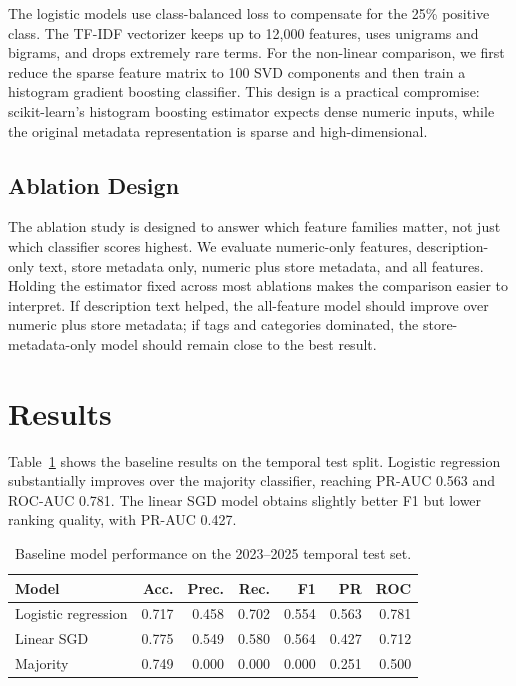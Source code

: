 \documentclass[11pt,sigconf,nonacm]{acmart}
\begin{document}
The logistic models use class-balanced loss to compensate for the 25\% positive class. The TF-IDF vectorizer keeps up to 12,000 features, uses unigrams and bigrams, and drops extremely rare terms. For the non-linear comparison, we first reduce the sparse feature matrix to 100 SVD components and then train a histogram gradient boosting classifier. This design is a practical compromise: scikit-learn's histogram boosting estimator expects dense numeric inputs, while the original metadata representation is sparse and high-dimensional.

\subsection{Ablation Design}

The ablation study is designed to answer which feature families matter, not just which classifier scores highest. We evaluate numeric-only features, description-only text, store metadata only, numeric plus store metadata, and all features. Holding the estimator fixed across most ablations makes the comparison easier to interpret. If description text helped, the all-feature model should improve over numeric plus store metadata; if tags and categories dominated, the store-metadata-only model should remain close to the best result.

\section{Results}

Table~\ref{tab:baselines} shows the baseline results on the temporal test split. Logistic regression substantially improves over the majority classifier, reaching PR-AUC 0.563 and ROC-AUC 0.781. The linear SGD model obtains slightly better F1 but lower ranking quality, with PR-AUC 0.427.

\begin{table}[t]
\centering
\caption{Baseline model performance on the 2023--2025 temporal test set.}
\label{tab:baselines}
\small
\setlength{\tabcolsep}{3pt}
\begin{tabular}{lrrrrrr}
\toprule
Model & Acc. & Prec. & Rec. & F1 & PR & ROC \\
\midrule
Logistic regression & 0.717 & 0.458 & 0.702 & 0.554 & 0.563 & 0.781 \\
Linear SGD & 0.775 & 0.549 & 0.580 & 0.564 & 0.427 & 0.712 \\
Majority & 0.749 & 0.000 & 0.000 & 0.000 & 0.251 & 0.500 \\
\bottomrule
\end{tabular}
\end{table}
\end{document}

